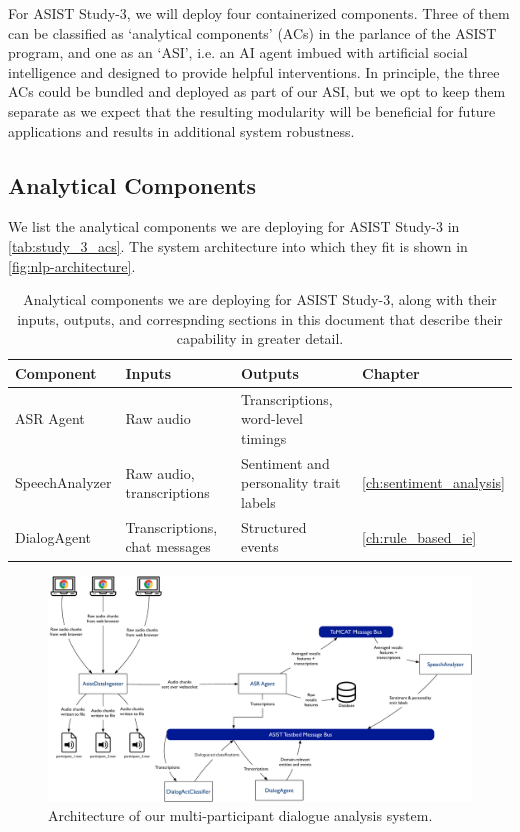 For ASIST Study-3, we will deploy four containerized components. Three of them
can be classified as `analytical components' (ACs) in the parlance of the ASIST
program, and one as an `ASI', i.e. an AI agent imbued with artificial social
intelligence and designed to provide helpful interventions. In principle, the
three ACs could be bundled and deployed as part of our ASI, but we opt to keep
them separate as we expect that the resulting modularity will be beneficial for
future applications and results in additional system robustness.


\subsection{Analytical Components}

We list the analytical components we are deploying for ASIST Study-3 in
\autoref{tab:study_3_acs}. The system architecture into which they fit is shown
in \autoref{fig:nlp-architecture}.

\begin{table}
    \small
    \begin{tabularx}{5.5in}{llXl}
        \toprule
        Component           & Inputs                        & Outputs                                & Chapter\\\midrule
        ASR Agent           & Raw audio                     & Transcriptions, word-level timings     & \\
        SpeechAnalyzer      & Raw audio, transcriptions     & Sentiment and personality trait labels & \autoref{ch:sentiment_analysis}\\
        DialogAgent         & Transcriptions, chat messages & Structured events                      & \autoref{ch:rule_based_ie}\\
        \bottomrule
    \end{tabularx}
    \caption{%
        Analytical components we are deploying for ASIST Study-3, along with
        their inputs, outputs, and correspnding sections in this document that
        describe their capability in greater detail.
    }
    \label{tab:study_3_acs}
\end{table}


\begin{figure}
    \centering
    \includegraphics[width=6in]{images/nlp_architecture}
    \caption{Architecture of our multi-participant dialogue analysis system.}
    \label{fig:nlp-architecture}
\end{figure}

